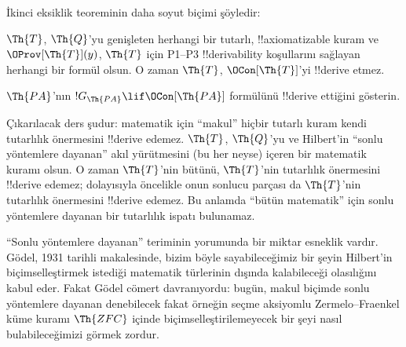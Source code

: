 İkinci eksiklik teoreminin daha soyut biçimi şöyledir:

\begin{thm}
 $\Th{T}$, $\Th{Q}$'yu genişleten
herhangi bir tutarlı, !!{axiomatizable} kuram ve $\OProv[\Th{T}](y)$,
$\Th{T}$ için P1--P3 !!{derivability} koşullarını sağlayan herhangi bir formül
olsun. O zaman $\Th{T}$, $\OCon[\Th{T}]$'yi !!{derive} etmez.
\end{thm}

\begin{prob}
$\Th{PA}$'nın $!G_{\Th{PA}} \lif \OCon[\Th{PA}]$ formülünü !!{derive}
ettiğini gösterin.
\end{prob}

\begin{digress}
Çıkarılacak ders şudur: matematik için ``makul'' hiçbir tutarlı kuram kendi
tutarlılık önermesini !!{derive} edemez. $\Th{T}$, $\Th{Q}$'yu ve Hilbert'in
``sonlu yöntemlere dayanan'' akıl yürütmesini (bu her neyse) içeren bir
matematik kuramı olsun. O zaman $\Th{T}$'nin bütünü, $\Th{T}$'nin tutarlılık
önermesini !!{derive} edemez; dolayısıyla öncelikle onun sonlucu parçası da
$\Th{T}$'nin tutarlılık önermesini !!{derive} edemez. Bu anlamda ``bütün
matematik'' için sonlu yöntemlere dayanan bir tutarlılık ispatı bulunamaz.

``Sonlu yöntemlere dayanan'' teriminin yorumunda bir miktar esneklik vardır.
G\"odel, 1931 tarihli makalesinde, bizim böyle sayabileceğimiz bir şeyin
Hilbert'in biçimselleştirmek istediği matematik türlerinin dışında kalabileceği
olasılığını kabul eder. Fakat G\"odel cömert davranıyordu: bugün, makul biçimde
sonlu yöntemlere dayanan denebilecek fakat örneğin seçme aksiyomlu
Zermelo--Fraenkel küme kuramı $\Th{ZFC}$ içinde biçimselleştirilemeyecek bir
şeyi nasıl bulabileceğimizi görmek zordur.
\end{digress}

